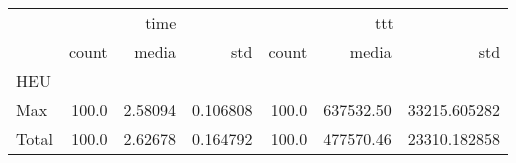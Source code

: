 \begin{tabular}{lrrrrrr}
\toprule
{} & \multicolumn{3}{c}{time} & \multicolumn{3}{c}{ttt} \\
{} &  count &    media &       std &  count &      media &           std \\
HEU   &        &          &           &        &            &               \\
\midrule
Max   &  100.0 &  2.58094 &  0.106808 &  100.0 &  637532.50 &  33215.605282 \\
Total &  100.0 &  2.62678 &  0.164792 &  100.0 &  477570.46 &  23310.182858 \\
\bottomrule
\end{tabular}
